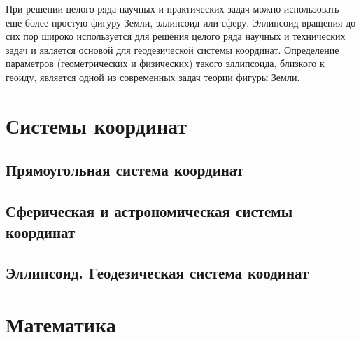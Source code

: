 \documentclass[11pt, a4paper]{article}
\theoremstyle{plain}
\theoremstyle{definition}
\theoremstyle{remark}
\begin{document}
При решении целого ряда научных и практических задач можно использовать еще более простую фигуру
Земли, эллипсоид или сферу. Эллипсоид вращения до сих пор широко используется для решения целого
ряда научных и технических задач и является основой для геодезической системы координат. Определение
параметров (геометрических и физических) такого эллипсоида, близкого к геоиду, является одной из
современных задач теории фигуры Земли.

\section{Системы координат}
\subsection{Прямоугольная система координат}

\subsection{Сферическая и астрономическая системы координат}

\subsection{Эллипсоид. Геодезическая система коодинат}

\section{Математика}

\printbibliography
\end{document}

